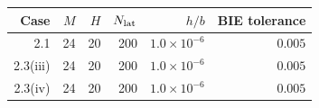 \begin{tabular}{rrrrrr}
\toprule
Case & $M$ & $H$ & $N_{\rm lat}$ & $h/b$ & BIE tolerance \\
\midrule
2.1 & 24 & 20 & 200 & $1.0\times10^{-6}$ & $0.005$ \\
2.3(iii) & 24 & 20 & 200 & $1.0\times10^{-6}$ & $0.005$ \\
2.3(iv) & 24 & 20 & 200 & $1.0\times10^{-6}$ & $0.005$ \\
\bottomrule
\end{tabular}
